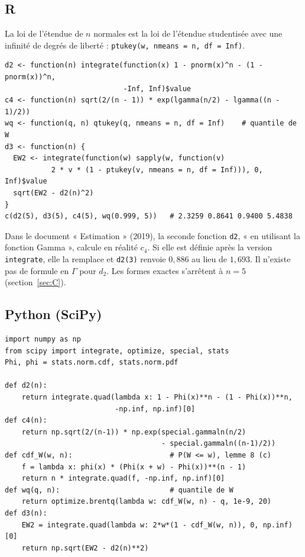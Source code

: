 \documentclass[11pt,a4paper]{article}
\theoremstyle{tq}
\theoremstyle{remark}
\begin{document}
\subsection{R}
La loi de l'étendue de $n$ normales est la loi de l'étendue studentisée avec une infinité de degrés de liberté : \texttt{ptukey(w, nmeans = n, df = Inf)}.
\begin{tcolorbox}[colback=gray!4,colframe=gray!40,boxrule=0.5pt,arc=1pt,left=4pt,right=4pt,top=2pt,bottom=2pt]
\small
\begin{verbatim}
d2 <- function(n) integrate(function(x) 1 - pnorm(x)^n - (1 - pnorm(x))^n,
                            -Inf, Inf)$value
c4 <- function(n) sqrt(2/(n - 1)) * exp(lgamma(n/2) - lgamma((n - 1)/2))
wq <- function(q, n) qtukey(q, nmeans = n, df = Inf)    # quantile de W
d3 <- function(n) {
  EW2 <- integrate(function(w) sapply(w, function(v)
           2 * v * (1 - ptukey(v, nmeans = n, df = Inf))), 0, Inf)$value
  sqrt(EW2 - d2(n)^2)
}
c(d2(5), d3(5), c4(5), wq(0.999, 5))   # 2.3259 0.8641 0.9400 5.4838
\end{verbatim}
\end{tcolorbox}
\begin{alerte}
Dans le document « Estimation » (2019), la seconde fonction \texttt{d2}, « en utilisant la fonction Gamma », calcule en réalité $c_4$. Si elle est définie après la version \texttt{integrate}, elle la remplace et \texttt{d2(3)} renvoie $0{,}886$ au lieu de $1{,}693$. Il n'existe pas de formule en $\Gamma$ pour $d_2$. Les formes exactes s'arrêtent à $n=5$ (section~\ref{sec:C}).
\end{alerte}

\subsection{Python (SciPy)}
\begin{tcolorbox}[colback=gray!4,colframe=gray!40,boxrule=0.5pt,arc=1pt,left=4pt,right=4pt,top=2pt,bottom=2pt]
\small
\begin{verbatim}
import numpy as np
from scipy import integrate, optimize, special, stats
Phi, phi = stats.norm.cdf, stats.norm.pdf

def d2(n):
    return integrate.quad(lambda x: 1 - Phi(x)**n - (1 - Phi(x))**n,
                          -np.inf, np.inf)[0]
def c4(n):
    return np.sqrt(2/(n-1)) * np.exp(special.gammaln(n/2)
                                     - special.gammaln((n-1)/2))
def cdf_W(w, n):                       # P(W <= w), lemme 8 (c)
    f = lambda x: phi(x) * (Phi(x + w) - Phi(x))**(n - 1)
    return n * integrate.quad(f, -np.inf, np.inf)[0]
def wq(q, n):                          # quantile de W
    return optimize.brentq(lambda w: cdf_W(w, n) - q, 1e-9, 20)
def d3(n):
    EW2 = integrate.quad(lambda w: 2*w*(1 - cdf_W(w, n)), 0, np.inf)[0]
    return np.sqrt(EW2 - d2(n)**2)
\end{verbatim}
\end{tcolorbox}
\end{document}
